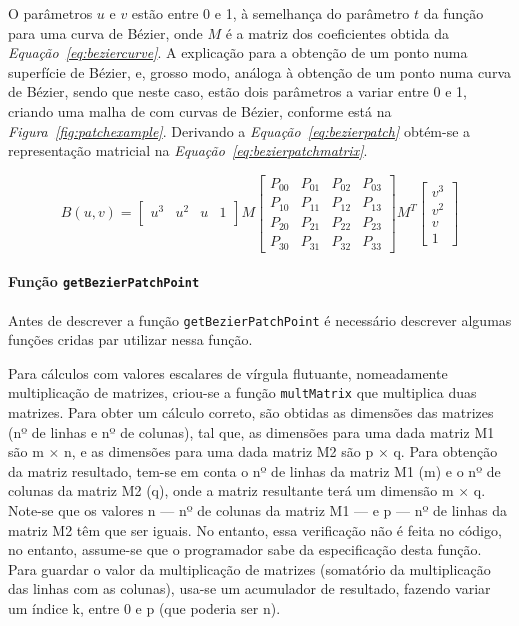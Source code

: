 O parâmetros $u$ e $v$ estão entre 0 e 1, à semelhança do parâmetro $t$ da
função para uma curva de Bézier, onde $M$ é a matriz dos coeficientes obtida da
\emph{Equação~\ref{eq:beziercurve}}. A explicação para a obtenção de um ponto
numa superfície de Bézier, e, grosso modo, análoga à obtenção de um ponto numa
curva de Bézier, sendo que neste caso, estão dois parâmetros a variar entre
0 e 1, criando uma malha de com curvas de Bézier, conforme está na
\emph{Figura~\ref{fig:patchexample}}. Derivando
a \emph{Equação~\ref{eq:bezierpatch}} obtém-se
a representação matricial na \emph{Equação~\ref{eq:bezierpatchmatrix}}.

\begin{equation}
B(u,v) = \begin{bmatrix}
       u^{3} & u^{2} & u & 1          \\
		\end{bmatrix}
		M\begin{bmatrix}
		       P_{00} & P_{01} & P_{02} & P_{03}   \\
		       P_{10} & P_{11} & P_{12} & P_{13}   \\
		       P_{20} & P_{21} & P_{22} & P_{23}   \\
		       P_{30} & P_{31} & P_{32} & P_{33}
		     \end{bmatrix}
		M^{T} \begin{bmatrix}
		       v^{3} \\
		       v^{2} \\
		       v \\
		       1
		     \end{bmatrix}
\label{eq:bezierpatchmatrix}				 
\end{equation}

\paragraph{Função \texttt{getBezierPatchPoint}}

Antes de descrever a função \texttt{getBezierPatchPoint} é necessário descrever
algumas funções cridas par utilizar nessa função. 

Para cálculos com valores escalares de vírgula flutuante, nomeadamente
multiplicação de matrizes, criou-se a função \texttt{multMatrix} que multiplica
duas matrizes. Para obter um cálculo correto, são obtidas as dimensões das
matrizes (nº de linhas e nº de colunas), tal que, as dimensões para uma dada
matriz M1 são m $\times$ n, e as dimensões para uma dada 
matriz M2 são p $\times$ q. Para obtenção da matriz resultado, tem-se em conta
o nº de linhas da matriz M1 (m) e o nº de colunas da matriz M2 (q), onde
a matriz resultante terá um dimensão m $\times$ q. Note-se que os valores n ---
nº de colunas da matriz M1 --- e p --- nº de linhas da matriz M2 têm que ser
iguais. No entanto, essa verificação não é feita no código, no entanto,
assume-se que o programador sabe da especificação desta função. Para guardar
o valor da multiplicação de matrizes (somatório da multiplicação das linhas com
as colunas), usa-se um acumulador de resultado, fazendo variar um índice k,
entre 0 e p (que poderia ser n).

